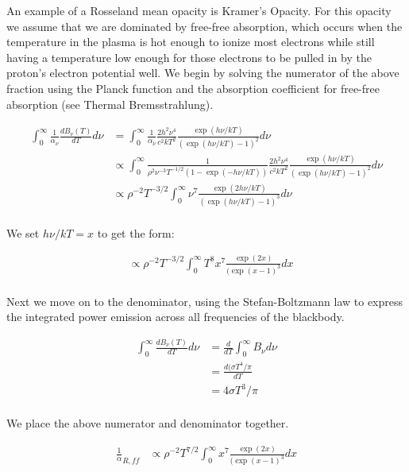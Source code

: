 \documentclass{article}
\begin{document}
An example of a Rosseland mean opacity is Kramer's Opacity. For this opacity we assume that we are dominated by free-free absorption, which occurs when the temperature in the plasma is hot enough to ionize most electrons while still having a temperature low enough for those electrons to be pulled in by the proton's electron potential well. We begin by solving the numerator of the above fraction using the Planck function and the absorption coefficient for free-free absorption (see Thermal Bremsstrahlung).

$$
\begin{aligned}
\int_{0}^{\infty} \frac{1}{\alpha_\nu} \frac{dB_\nu(T)}{dT} d\nu &= \int_{0}^{\infty} \frac{1}{\alpha_\nu} \frac{2 h^2 \nu^4}{c^2 k T^2} \frac{\exp(h\nu/kT)}{(\exp(h\nu/kT)-1)^2} d\nu \\
&\propto  \int_{0}^{\infty} \frac{1}{\rho^2 \nu^{-3} T^{-1/2} (1-\exp(-h\nu/kT))} \frac{2 h^2 \nu^4}{c^2 k T^2} \frac{\exp(h\nu/kT)}{(\exp(h\nu/kT)-1)^2} d\nu \\
&\propto \rho^{-2} T^{-3/2} \int_{0}^{\infty} \nu^7 \frac{\exp(2h\nu/kT)}{(\exp(h\nu/kT) - 1)^3} d\nu \\
\end{aligned}
$$

We set $h\nu/kT = x$ to get the form:

$$
\begin{aligned}
&\propto \rho^{-2} T^{-3/2} \int_{0}^{\infty} T^8 x^7 \frac{\exp(2x)}{(\exp(x-1)^3} dx \\
\end{aligned}
$$

Next we move on to the denominator, using the Stefan-Boltzmann law to express the integrated power emission across all frequencies of the blackbody.

$$
\begin{aligned}
\int_{0}^{\infty} \frac{dB_\nu(T)}{dT} d\nu &= \frac{d}{dT} \int_{0}^{\infty} B_\nu d\nu \\
&= \frac{d(\sigma T^4 / \pi}{dT} \\
&= 4 \sigma T^3 / \pi \\
\end{aligned}
$$

We place the above numerator and denominator together.

$$
\begin{aligned}
\frac{1}\alpha_{R,ff} &\propto \rho^{-2} T^{7/2} \int_{0}^{\infty} x^7 \frac{\exp(2x)}{(\exp(x-1)^3} dx \\
\end{aligned}
$$
\end{document}
